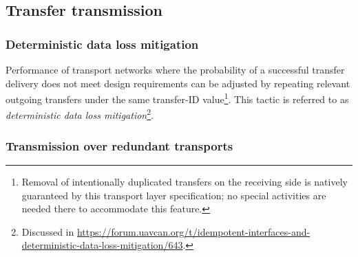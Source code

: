 \subsection{Transfer transmission}

\subsubsection{Deterministic data loss mitigation}\label{sec:transport_deterministic_data_loss_mitigation}

Performance of transport networks where the probability of a successful transfer delivery
does not meet design requirements can be adjusted by repeating relevant outgoing transfers
under the same transfer-ID value\footnote{%
    Removal of intentionally duplicated transfers on the receiving side is natively guaranteed
    by this transport layer specification;
    no special activities are needed there to accommodate this feature.
}.
This tactic is referred to as \emph{deterministic data loss mitigation}\footnote{%
    Discussed in
    \url{https://forum.uavcan.org/t/idempotent-interfaces-and-deterministic-data-loss-mitigation/643}.
}.

\subsubsection{Transmission over redundant transports}

